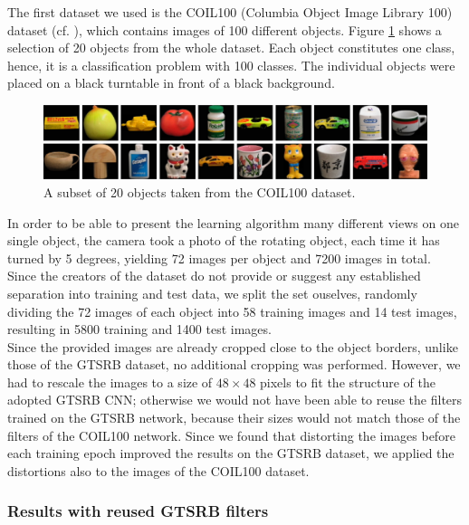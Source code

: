 \documentclass[11pt, a4paper]{article}
\begin{document}
The first dataset we used is the COIL100 (Columbia Object Image Library 100) dataset (cf. \cite{columbia_object_image_library}), which contains images of 100 different objects. Figure \ref{fig:coil100_objects} shows a selection of 20 objects from the whole dataset. Each object constitutes one class, hence, it is a classification problem with 100 classes. The individual objects were placed on a black turntable in front of a black background. 
\begin{figure}[h!]
	\centering
	\includegraphics[width=1\textwidth]{coil100}
	\caption{A subset of 20 objects taken from the COIL100 dataset.}
	\label{fig:coil100_objects}
\end{figure}
In order to be able to present the learning algorithm many different views on one single object, the camera took a photo of the rotating object, each time it has turned by 5 degrees, yielding 72 images per object and 7200 images in total. Since the creators of the dataset do not provide or suggest any established separation into training and test data, we split the set ouselves, randomly dividing the 72 images of each object into 58 training images and 14 test images, resulting in 5800 training and 1400 test images.\\
Since the provided images are already cropped close to the object borders, unlike those of the GTSRB dataset, no additional cropping was performed. However, we had to rescale the images to a size of $48 \times 48$ pixels to fit the structure of the adopted GTSRB CNN; otherwise we would not have been able to reuse the filters trained on the GTSRB network, because their sizes would not match those of the filters of the COIL100 network. Since we found that distorting the images before each training epoch improved the results on the GTSRB dataset, we applied the distortions also to the images of the COIL100 dataset.

\subsubsection{Results with reused GTSRB filters}
\end{document}
